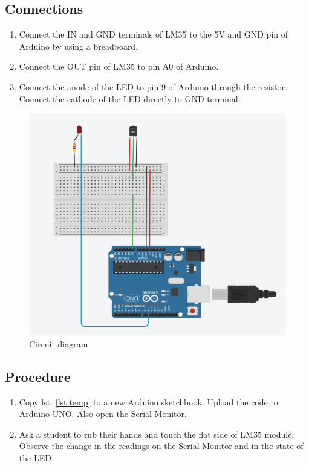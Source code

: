 \subsection*{Connections}
\begin{enumerate}[leftmargin=*]
    \item Connect the IN and GND terminals of LM35 to the 5V and GND pin of Arduino by using a breadboard.
    \item Connect the OUT pin of LM35 to pin A$0$ of Arduino.
    \item Connect the anode of the LED to pin 9 of Arduino through the resistor. Connect the cathode of the LED directly to GND terminal.
\end{enumerate}

\begin{figure}[H]
    \centering
    \includegraphics[scale=0.6]{Figures/heat.PNG}
    \caption{Circuit diagram}
\end{figure}

\subsection*{Procedure}
\begin{enumerate}
    \item Copy lst. \ref{lst:temp} to a new Arduino sketchbook. Upload the code to Arduino UNO. Also open the Serial Monitor.
    \item Ask a student to rub their hands and touch the flat side of LM35 module. Observe the change in the readings on the Serial Monitor and in the state of the LED.
\end{enumerate}

